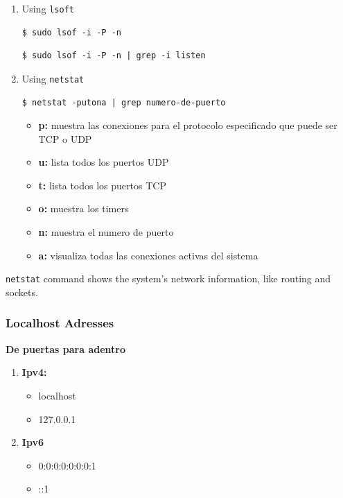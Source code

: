 \documentclass{article}
\newenvironment{blocktemplate}[1]{%
    \tcolorbox[beamer,%
    noparskip,breakable,
    colframe=Blue,%
    colbacklower=LimeGreen!75!LightGreen,%
    title=#1]}%
    {\endtcolorbox}
\newenvironment{codetemplate}[1][]{%
  \mybasecolorbox[#1]
  \itshape
}{%
  \endmybasecolorbox
}
\begin{document}
\begin{enumerate}
    \item Using \verb|lsoft|
\begin{codetemplate}{}
\begin{verbatim}
$ sudo lsof -i -P -n
\end{verbatim}
\end{codetemplate}
\begin{codetemplate}{}
\begin{verbatim}
$ sudo lsof -i -P -n | grep -i listen
\end{verbatim}
\end{codetemplate}

    \item Using \verb|netstat|
\begin{codetemplate}{}
\begin{verbatim}
$ netstat -putona | grep numero-de-puerto
\end{verbatim}
\end{codetemplate}

\begin{itemize}
    \item \textbf{p:} muestra las conexiones para el protocolo especificado que puede ser TCP o UDP
    \item \textbf{u:} lista todos los puertos UDP
    \item \textbf{t:} lista todos los puertos TCP
    \item \textbf{o:} muestra los timers
    \item \textbf{n:} muestra el numero de puerto
    \item \textbf{a:} visualiza todas las conexiones activas del sistema
\end{itemize}
\end{enumerate}

\begin{blocktemplate}{NOTE}
\verb|netstat| command shows the system’s network information, like routing and sockets.
\end{blocktemplate}

\subsubsection{Localhost Adresses}

\textbf{De puertas para adentro}
\begin{enumerate}
    \item \textbf{Ipv4:}
    \begin{itemize}
        \item localhost
        \item 127.0.0.1
    \end{itemize}
    \item \textbf{Ipv6}
    \begin{itemize}
        \item 0:0:0:0:0:0:0:1
        \item ::1
    \end{itemize}
\end{enumerate}
\end{document}
